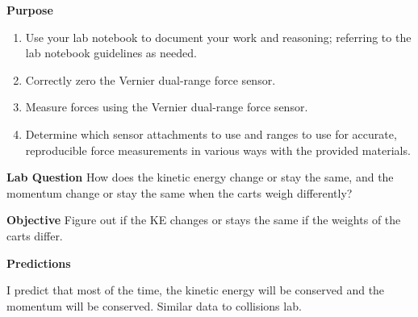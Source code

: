 \documentclass[idxtotoc,hyperref,openany]{labbook} %
\begin{document}
\textbf{Purpose}
\begin{enumerate}
    \item Use your lab notebook to document your work and reasoning; referring to the lab notebook guidelines as needed.
    \item Correctly zero the Vernier dual-range force sensor.
    \item Measure forces using the Vernier dual-range force sensor.
    \item Determine which sensor attachments to use and ranges to use for accurate, reproducible force measurements in various ways with the provided materials.
\end{enumerate}

\hfill \break
\textbf{Lab Question}
How does the kinetic energy change or stay the same, and the momentum change or stay the same when the carts weigh differently?

\hfill \break
\textbf{Objective}
Figure out if the KE changes or stays the same if the weights of the carts differ.

\hfill \break
\textbf{Predictions}

I predict that most of the time, the kinetic energy will be conserved and the momentum will be conserved. Similar data to collisions lab.
\end{document}
